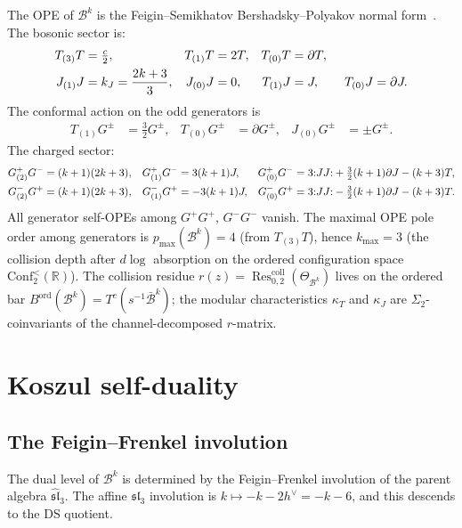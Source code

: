 \documentclass[11pt]{article}
\theoremstyle{plain}
\theoremstyle{definition}
\theoremstyle{remark}
\newcommand{\fsl}{\mathfrak{sl}}
\newcommand{\cB}{\mathcal{B}}
\newcommand{\Res}{\operatorname{Res}}
\numberwithin{equation}{section}
\begin{document}
The OPE of $\cB^k$ is the Feigin--Semikhatov Bershadsky--Polyakov
normal form~\cite[(A.3)]{FeiginSemikhatov}. The bosonic sector is:
\begin{align}\label{eq:bp-ope-bosonic}
 T_{(3)}T &= \tfrac{c}{2}, &
 T_{(1)}T &= 2T, &
 T_{(0)}T &= \partial T, \notag\\
 J_{(1)}J &= k_J=\frac{2k+3}{3}, &
 J_{(0)}J &= 0, &
 T_{(1)}J &= J,\qquad T_{(0)}J = \partial J.
\end{align}
The conformal action on the odd generators is
\begin{align}\label{eq:bp-ope-primary}
 T_{(1)}G^\pm &= \tfrac{3}{2}G^\pm, &
 T_{(0)}G^\pm &= \partial G^\pm, &
 J_{(0)}G^\pm &= \pm G^\pm .
\end{align}
The charged sector:
\begin{align}\label{eq:bp-ope-charged}
 G^+_{(2)}G^- &= (k+1)(2k+3), &
 G^+_{(1)}G^- &= 3(k+1)J, &
 G^+_{(0)}G^- &= 3{:}JJ{:}+\tfrac{3}{2}(k+1)\partial J-(k+3)T,
 \notag\\
 G^-_{(2)}G^+ &= (k+1)(2k+3), &
 G^-_{(1)}G^+ &= -3(k+1)J, &
 G^-_{(0)}G^+ &= 3{:}JJ{:}-\tfrac{3}{2}(k+1)\partial J-(k+3)T.
\end{align}
All generator self-OPEs among $G^+G^+$, $G^-G^-$ vanish. The
maximal OPE pole order among generators is $p_{\max}(\cB^k) = 4$
(from $T_{(3)}T$), hence $k_{\max} = 3$ (the collision depth after
$d\log$ absorption on the ordered configuration space
$\mathrm{Conf}_2^<(\mathbb{R})$). The collision residue
$r(z) = \Res^{\mathrm{coll}}_{0,2}(\Theta_{\cB^k})$ lives on the
ordered bar $B^{\mathrm{ord}}(\cB^k) = T^c(s^{-1}\bar{\cB}^k)$;
the modular characteristics $\kappa_T$ and $\kappa_J$ are
$\Sigma_2$-coinvariants of the channel-decomposed $r$-matrix.

\section{Koszul self-duality}\label{sec:koszul}

\subsection{The Feigin--Frenkel involution}

The dual level of $\cB^k$ is determined by the Feigin--Frenkel
involution of the parent algebra $\widehat{\fsl}_3$. The affine
$\fsl_3$ involution is $k \mapsto -k - 2h^\vee = -k - 6$, and this
descends to the DS quotient.
\end{document}
